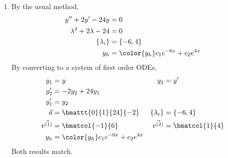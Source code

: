\begin{enumerate}
    \item By the usual method,
          \begin{align}
              y'' + 2y' - 24y             & = 0                                    \\
              \lambda^{2} + 2\lambda - 24 & = 0                                    \\
              \{\lambda_i\}               & = \{-6, 4\}                            \\
              y_h                         & = \color{y_h} c_1 e^{-6x} + c_2 e^{4x}
          \end{align}
          By converting to a system of first order ODEs,
          \begin{align}
              y_1           & = y                                    &
              y_2           & = y'                                     \\
              y_2'          & = -2y_2 + 24y_1                          \\
              y_1'          & = y_2                                    \\
              \vec{a}       & = \bmattt{0}{1}{24}{-2}                &
              \{\lambda_i\} & = \{-6, 4\}                              \\
              \vec{v^{(1)}} & = \bmatcol{-1}{6}                      &
              \vec{v^{(2)}} & = \bmatcol{1}{4}                         \\
              y_h           & = \color{y_h} c_1 e^{-6x} + c_2 e^{4x}
          \end{align}
          Both results match.


\end{enumerate}
